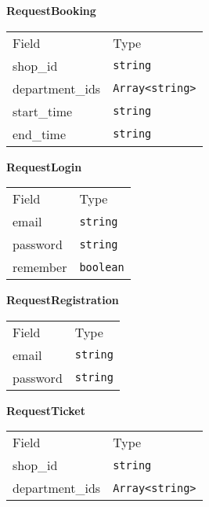     \begin{table}[H]
    \centering
    \textbf{RequestBooking}\\
    \everyrow{\tabucline[0.5pt]-}
    \begin{tabu} to 0.55\textwidth {|X|X|} \hline
    Field & Type \\
    shop\_id & \texttt{string} \\
department\_ids & \texttt{Array<string>} \\
start\_time & \texttt{string} \\
end\_time & \texttt{string} \\
\end{tabu}
\end{table}


    \begin{table}[H]
    \centering
    \textbf{RequestLogin}\\
    \everyrow{\tabucline[0.5pt]-}
    \begin{tabu} to 0.55\textwidth {|X|X|} \hline
    Field & Type \\
    email & \texttt{string} \\
password & \texttt{string} \\
remember & \texttt{boolean} \\
\end{tabu}
\end{table}


    \begin{table}[H]
    \centering
    \textbf{RequestRegistration}\\
    \everyrow{\tabucline[0.5pt]-}
    \begin{tabu} to 0.55\textwidth {|X|X|} \hline
    Field & Type \\
    email & \texttt{string} \\
password & \texttt{string} \\
\end{tabu}
\end{table}


    \begin{table}[H]
    \centering
    \textbf{RequestTicket}\\
    \everyrow{\tabucline[0.5pt]-}
    \begin{tabu} to 0.55\textwidth {|X|X|} \hline
    Field & Type \\
    shop\_id & \texttt{string} \\
department\_ids & \texttt{Array<string>} \\
\end{tabu}
\end{table}

